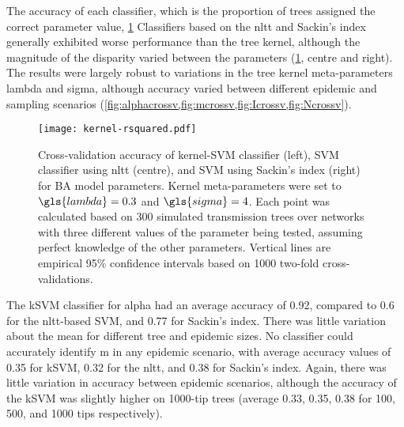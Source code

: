 The accuracy of each classifier, which is the proportion of trees assigned the
correct parameter value,   \cref{fig:rsquared}  Classifiers based on
 the \gls{nltt} and Sackin's index generally
exhibited worse performance than the tree kernel, although the magnitude of the
disparity varied between the parameters (\cref{fig:rsquared}, centre and
right). The results were largely robust to variations in the tree kernel
meta-parameters \gls{lambda} and \gls{sigma}, although accuracy varied between
different epidemic and sampling scenarios
(\cref{fig:alphacrossv,fig:mcrossv,fig:Icrossv,fig:Ncrossv}). 

\begin{figure}[ht]
    \centering
    \texttt{[image: kernel-rsquared.pdf]}
    \caption[
        Cross-validation accuracy of kernel-SVM, nLTT-based SVM, and Sackin's
        SVM classifiers for BA model parameters.
    ]{
        Cross-validation accuracy of kernel-SVM classifier (left), SVM
        classifier using \gls{nltt} (centre), and SVM using Sackin's index
        (right) for \gls{BA} model parameters. Kernel meta-parameters were set
        to $\gls{lambda} = 0.3$ and $\gls{sigma} = 4$. Each point was
        calculated based on 300 simulated transmission trees over networks with
        three different values of the parameter being tested, assuming perfect
        knowledge of the other parameters. Vertical lines are empirical 95\%
        confidence intervals based on 1000 two-fold cross-validations. 
    }
    \label{fig:rsquared}
\end{figure}

The \gls{kSVM} classifier for \gls{alpha} had an average accuracy of 
    0.92,
compared to 
    0.6
for the \gls{nltt}-based SVM, and
    0.77
for Sackin's index. There was little variation about the mean for different
tree and epidemic sizes. No classifier could accurately identify \gls{m} in any
epidemic scenario, with average accuracy values of 
  0.35 for \gls{kSVM},
  0.32 for the \gls{nltt}, and
  0.38
for Sackin's index. Again, there was little variation in accuracy between
epidemic scenarios, although the accuracy of the \gls{kSVM} was slightly higher
on 1000-tip trees 
    (average 
     0.33,
     0.35,
     0.38
     for 100, 500, and 1000 tips respectively).

